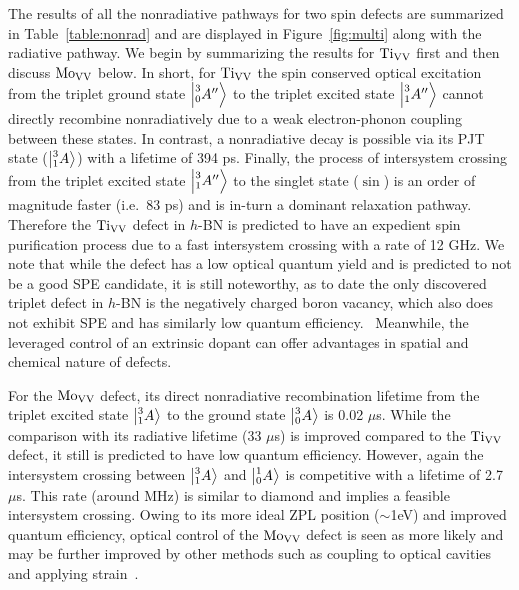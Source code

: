 The results of all the nonradiative  pathways for two spin defects are summarized in Table~\ref{table:nonrad} and are displayed in Figure~\ref{fig:multi} along with the radiative pathway.
We begin by summarizing the results for $\text{Ti}_{\text{V}\text{V}}$ first and then discuss $\text{Mo}_{\text{V}\text{V}}$ below. In short, for $\text{Ti}_{\text{V}\text{V}}$ the spin conserved optical excitation from the triplet ground state $\ket{\prescript{3}{0}{A''}}$ to the triplet excited state $\ket{\prescript{3}{1}{A''}}$ cannot directly recombine nonradiatively due to a weak electron-phonon coupling between these states.
In contrast, a nonradiative decay is possible via its PJT state ($\ket{\prescript{3}{1}{A}}$) with a lifetime of 394 ps.
Finally, the process of intersystem crossing from the triplet excited state $\ket{\prescript{3}{1}{A''}}$ to the singlet state ($\sin$) is an order of magnitude faster (i.e.\ 83 ps) and is in-turn a dominant relaxation pathway. Therefore the $\text{Ti}_{\text{V}\text{V}}$ defect in $h$-BN is predicted to have an expedient spin purification process due to a fast intersystem crossing with a rate of 12 GHz.
We note that while the defect has a low optical quantum yield and is predicted to not be a good SPE candidate, it is still noteworthy, as to date the only discovered triplet defect in $h$-BN is the negatively charged boron vacancy, which also does not exhibit SPE and has similarly low quantum efficiency.~\cite{kianinia2020generation} Meanwhile, the leveraged control of an extrinsic dopant can offer advantages in spatial and chemical nature of defects.

For the $\text{Mo}_{\text{V}\text{V}}$ defect, its direct nonradiative recombination lifetime from the triplet excited state $\ket{\prescript{3}{1}{A}}$ to the ground state $\ket{\prescript{3}{0}{A}}$ is 0.02 $\mu$s.
While the comparison with its radiative lifetime (33 $\mu$s) is improved compared to the $\text{Ti}_{\text{V}\text{V}}$ defect, it still is predicted to have low quantum efficiency.
However, again the intersystem crossing between $\ket{\prescript{3}{1}{A}}$ and $\ket{\prescript{1}{0}{A}}$ is competitive with a lifetime of 2.7 $\mu$s. This rate (around MHz) is similar to diamond and implies a feasible intersystem crossing. Owing to its more ideal ZPL position ($\sim$1eV) and improved quantum efficiency, optical control of the $\text{Mo}_{\text{V}\text{V}}$ defect is seen as more likely and may be further improved by other methods such as coupling to optical cavities~\cite{kim2018photonic,zhong2018optically} and applying strain~\cite{wu2019carrier,mendelson2020strain}.

